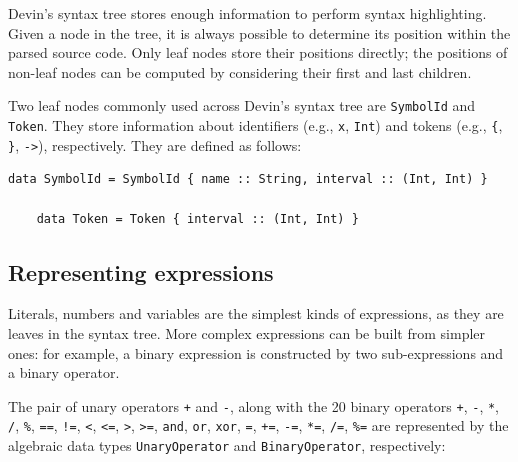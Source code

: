 \documentclass[UdineBachThesis,american,11pt]{PhdThesis}
\begin{document}
  Devin's syntax tree stores enough information to perform syntax highlighting.
  Given a node in the tree, it is always possible to determine its position
  within the parsed source code. Only leaf nodes store their positions directly;
  the positions of non-leaf nodes can be computed by considering their first and
  last children.

  Two leaf nodes commonly used across Devin's syntax tree are
  \mbox{\texttt{SymbolId}} and \mbox{\texttt{Token}}. They store information
  about identifiers (e.g., \texttt{x}, \mbox{\texttt{Int}}) and tokens (e.g.,
  \texttt{\{}, \texttt{\}}, \mbox{\texttt{->}}), respectively. They are defined
  as follows:

  \begin{Verbatim}[gobble=4,fontsize=\small]
    data SymbolId = SymbolId { name :: String, interval :: (Int, Int) }

    data Token = Token { interval :: (Int, Int) }
  \end{Verbatim}

  \newpage

  \subsection{Representing expressions}

  Literals, numbers and variables are the simplest kinds of expressions, as they
  are leaves in the syntax tree. More complex expressions can be built from
  simpler ones: for example, a binary expression is constructed by two
  sub-expressions and a binary operator.

  The pair of unary operators \texttt{+} and \texttt{-}, along with the 20
  binary operators \texttt{+}, \texttt{-}, \texttt{*}, \texttt{/}, \texttt{\%},
  \mbox{\texttt{==}}, \mbox{\texttt{!=}}, \texttt{<}, \mbox{\texttt{<=}},
  \texttt{>}, \mbox{\texttt{>=}}, \mbox{\texttt{and}}, \mbox{\texttt{or}},
  \mbox{\texttt{xor}}, \texttt{=}, \mbox{\texttt{+=}}, \mbox{\texttt{-=}},
  \mbox{\texttt{*=}}, \mbox{\texttt{/=}}, \mbox{\texttt{\%=}} are represented by
  the algebraic data types \mbox{\texttt{UnaryOperator}} and
  \mbox{\texttt{BinaryOperator}}, respectively:
\end{document}
